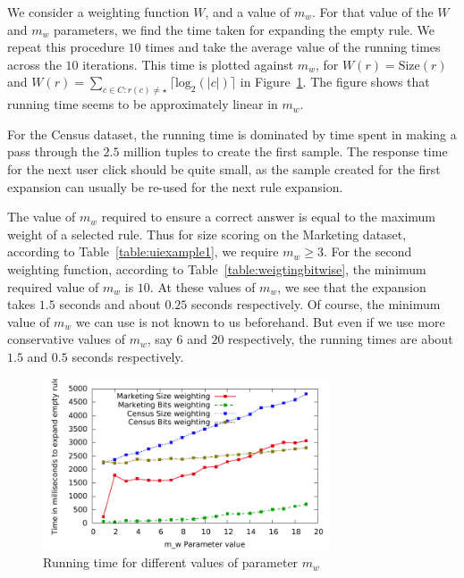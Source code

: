 We consider a weighting function $W$, and a value of $m_w$. For that value of the $W$ and $m_w$ parameters, we find the time taken for expanding the empty rule. We repeat this procedure $10$ times and take the average value of the running times across the $10$ iterations. This time is plotted against $m_w$, for $W(r) = \text{Size}(r)$ and $W(r) = \sum_{c \in C : r(c) \neq \star} \lceil \text{log}_2(|c|) \rceil$ in Figure~\ref{fig:mw_speed}. The figure shows that running time seems to be approximately linear in $m_w$. 

For the Census dataset, the running time is dominated by time spent in making a pass through the $2.5$ million tuples to create the first sample. The response time for the next user click should be quite small, as the sample created for the first expansion can usually be re-used for the next rule expansion.

The value of $m_w$ required to ensure a correct answer is equal to the maximum weight of a selected rule. Thus for size scoring on the Marketing dataset, according to Table~\ref{table:uiexample1}, we require $m_w \geq 3$. For the second weighting function, according to Table~\ref{table:weigtingbitwise}, the minimum required value of $m_w$ is $10$. At these values of $m_w$, we see that the expansion takes $1.5$ seconds and about $0.25$ seconds respectively. Of course, the minimum value of $m_w$ we can use is not known to us beforehand. But even if we use more conservative values of $m_w$, say $6$ and $20$ respectively, the running times are about $1.5$ and $0.5$ seconds respectively.

\begin{figure}
\hspace{-20pt}
  \includegraphics[height=2in]{graphs/mw_speed.pdf}%
\vspace{-5pt}
  \caption{Running time for different values of parameter $m_w$ \label{fig:mw_speed}}
\vspace{-20pt}
\end{figure}

